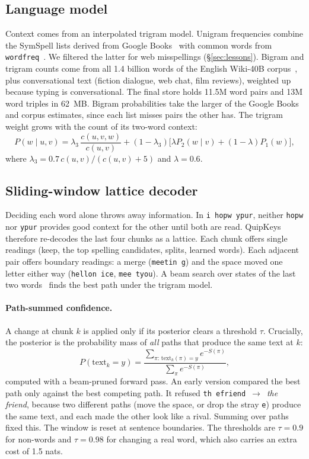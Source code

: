 \documentclass[11pt,a4paper]{article}
\newcommand{\qk}{QuipKeys}
\newcommand{\ttw}[1]{\texttt{#1}}
\begin{document}
\subsection{Language model}
Context comes from an interpolated trigram model. Unigram frequencies combine the SymSpell lists derived from Google Books~\citep{garbe2012symspell,michel2011} with common words from \ttw{wordfreq}~\citep{speer2018wordfreq}. We filtered the latter for web misspellings (\S\ref{sec:lessons}). Bigram and trigram counts come from all 1.4 billion words of the English Wiki-40B corpus~\citep{guo2020wiki40b}, plus conversational text (fiction dialogue, web chat, film reviews), weighted up because typing is conversational. The final store holds 11.5M word pairs and 13M word triples in 62~MB. Bigram probabilities take the larger of the Google Books and corpus estimates, since each list misses pairs the other has. The trigram weight grows with the count of its two-word context:
\begin{equation}
P(w\mid u,v) = \lambda_3\,\frac{c(u,v,w)}{c(u,v)} + (1-\lambda_3)\big[\lambda P_2(w\mid v) + (1-\lambda) P_1(w)\big],
\end{equation}
where $\lambda_3 = 0.7\,c(u,v)/(c(u,v)+5)$ and $\lambda = 0.6$.

\subsection{Sliding-window lattice decoder}
Deciding each word alone throws away information. In \ttw{i hopw ypur}, neither \ttw{hopw} nor \ttw{ypur} provides good context for the other until both are read. \qk{} therefore re-decodes the last four chunks as a lattice. Each chunk offers single readings (keep, the top spelling candidates, splits, learned words). Each adjacent pair offers boundary readings: a merge (\ttw{meetin g}) and the space moved one letter either way (\ttw{hellon ice}, \ttw{mee tyou}). A beam search over states of the last two words~\citep{rabiner1989} finds the best path under the trigram model.

\paragraph{Path-summed confidence.} A change at chunk $k$ is applied only if its posterior clears a threshold $\tau$. Crucially, the posterior is the probability mass of \emph{all} paths that produce the same text at $k$:
\begin{equation}
P(\text{text}_k = y) = \frac{\sum_{\pi:\,\text{text}_k(\pi)=y} e^{-S(\pi)}}{\sum_{\pi} e^{-S(\pi)}},
\end{equation}
computed with a beam-pruned forward pass. An early version compared the best path only against the best competing path. It refused \ttw{th efriend}~$\to$~\emph{the friend}, because two different paths (move the space, or drop the stray \ttw{e}) produce the same text, and each made the other look like a rival. Summing over paths fixed this. The window is reset at sentence boundaries. The thresholds are $\tau{=}0.9$ for non-words and $\tau{=}0.98$ for changing a real word, which also carries an extra cost of 1.5 nats.
\end{document}
